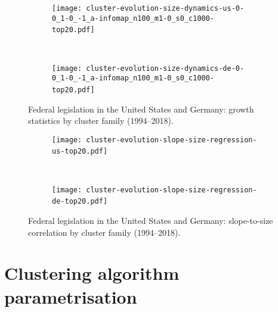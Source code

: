 \begin{table}[H]
	\centering
	\small
	
	\caption{Statistics regarding the OLS regressions in Figure~6 from the main paper %
		and Figure~\ref{fig:legislative-growth-cluster-top20}.
		The p-value column shows a two-sided p-value for a hypothesis test whose null hypothesis is that the slope is zero, using the Wald Test with t-distribution of the test statistic.} 
	\label{tab:cluster-family-growth-stats}
\end{table}

\begin{figure}[H]
	\centering
	\begin{subfigure}{0.5\linewidth}
		\texttt{[image: cluster-evolution-size-dynamics-us-0-0\_1-0\_-1\_a-infomap\_n100\_m1-0\_s0\_c1000-top20.pdf]}~%
	\end{subfigure}~%
	\begin{subfigure}{0.5\linewidth}
		\texttt{[image: cluster-evolution-size-dynamics-de-0-0\_1-0\_-1\_a-infomap\_n100\_m1-0\_s0\_c1000-top20.pdf]}~%
	\end{subfigure}
	\caption{Federal legislation in the United States and Germany: growth statistics by cluster family (1994--2018).}
	\label{fig:legislative-growth-cluster-top20}
\end{figure}
\begin{figure}[H]
	\centering
	\begin{subfigure}{0.5\linewidth}
		\texttt{[image: cluster-evolution-slope-size-regression-us-top20.pdf]}~%
	\end{subfigure}~%
	\begin{subfigure}{0.5\linewidth}
		\texttt{[image: cluster-evolution-slope-size-regression-de-top20.pdf]}~%
	\end{subfigure}
	\caption{Federal legislation in the United States and Germany: slope-to-size correlation by cluster family (1994--2018).
	}
	\label{fig:legislative-growth-cluster-stats}
\end{figure}

\newpage

\section{Clustering algorithm parametrisation}


